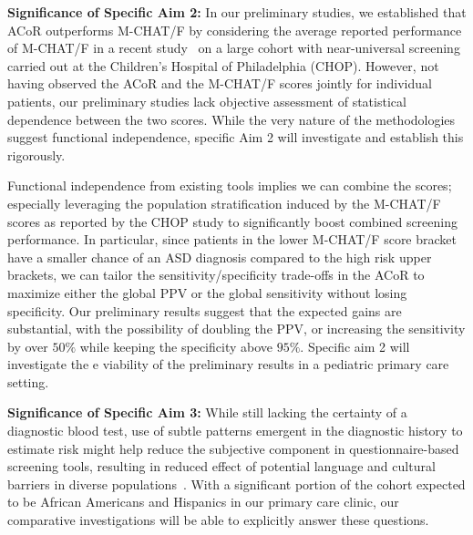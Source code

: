 \documentclass[onecolumn, compsoc,11pt]{IEEEtran}
\def\ZERO{ACoR\xspace}
\begin{document}
\textbf{Significance of Specific Aim 2:} 
In our preliminary studies, we established that \ZERO outperforms M-CHAT/F by considering the average reported performance of M-CHAT/F in a recent study~\cite{pmid31562252} on a large  cohort with near-universal screening carried out at the Children's Hospital of Philadelphia (CHOP). However, not having observed the \ZERO and the M-CHAT/F scores jointly for individual patients, our preliminary studies lack objective assessment of statistical dependence between the two scores. While the very nature of the methodologies  suggest functional independence, specific Aim 2 will investigate and establish this rigorously. 

Functional independence from existing tools implies  we can   combine the scores; especially leveraging the population stratification induced by the M-CHAT/F scores as reported by the CHOP study to significantly boost combined screening performance. In particular, since patients in the lower M-CHAT/F score bracket have a smaller chance of an ASD diagnosis compared to the high risk upper brackets, we can tailor the sensitivity/specificity trade-offs in the \ZERO to maximize  either the global PPV or the global sensitivity without losing specificity. Our preliminary results suggest that the expected gains are substantial, with the possibility of doubling the PPV, or increasing the sensitivity by over $50\%$ while keeping the specificity above $95\%$. Specific aim 2 will investigate the e viability of the preliminary results in a pediatric primary care setting.

\textbf{Significance of Specific Aim 3:} While still lacking the certainty of a diagnostic blood test,  use of subtle patterns emergent in  the diagnostic history to estimate risk might help reduce the subjective component in questionnaire-based screening tools, resulting in reduced effect of potential language and cultural barriers in diverse populations~\cite{hyman2020identification}. With a significant portion of the  cohort expected to be African Americans and Hispanics in our primary care clinic, our comparative investigations will be able to explicitly answer these questions.
\end{document}
